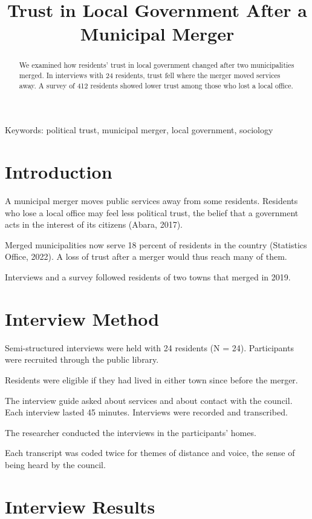 \documentclass{article}
\title{Trust in Local Government After a Municipal Merger}
\date{}
\begin{document}
\maketitle

\begin{abstract}
We examined how residents' trust in local government changed after two municipalities merged. In interviews with 24 residents, trust fell where the merger moved services away. A survey of 412 residents showed lower trust among those who lost a local office.
\end{abstract}

\noindent Keywords: political trust, municipal merger, local government, sociology

\section{Introduction}

A municipal merger moves public services away from some residents. Residents who lose a local office may feel less political trust, the belief that a government acts in the interest of its citizens (Abara, 2017).

Merged municipalities now serve 18 percent of residents in the country (Statistics Office, 2022). A loss of trust after a merger would thus reach many of them.

Interviews and a survey followed residents of two towns that merged in 2019.

\section{Interview Method}

Semi-structured interviews were held with 24 residents (N = 24). Participants were recruited through the public library.

Residents were eligible if they had lived in either town since before the merger.

The interview guide asked about services and about contact with the council. Each interview lasted 45 minutes. Interviews were recorded and transcribed.

The researcher conducted the interviews in the participants' homes.

Each transcript was coded twice for themes of distance and voice, the sense of being heard by the council.

\section{Interview Results}
\end{document}
